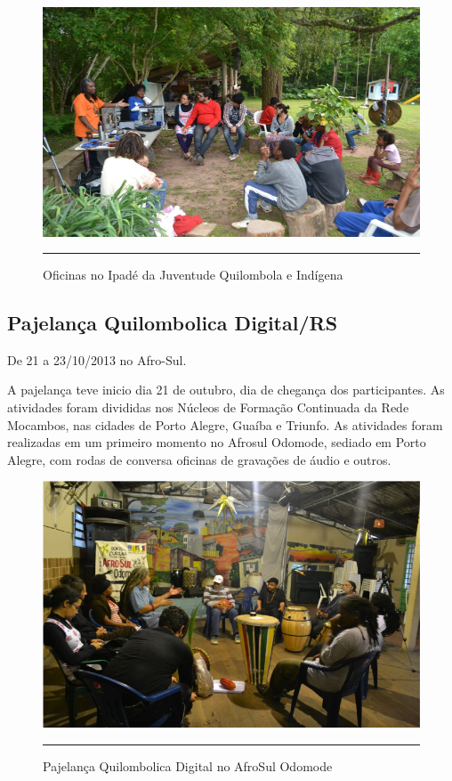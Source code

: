 \documentclass[a4paper, 11pt, oneside]{Relatorio_sem}  %
\begin{document}
\begin{figure}[htbp]
  \centering
  \includegraphics[width=\textwidth]{./Fig/Ipade_RS_1.pdf}
  \rule{35em}{0.5pt}
  \caption[Oficinas no Ipadé da Juventude Quilombola e Indígena]{Oficinas no Ipadé da Juventude Quilombola e Indígena}
  \label{fig:PajelancaPA}
\end{figure}

\subsection{Pajelança Quilombolica Digital/RS}
De 21 a 23/10/2013 no Afro-Sul.

A pajelança teve inicio dia 21 de outubro, dia de chegança dos
participantes.  As atividades foram divididas nos Núcleos de Formação
Continuada da Rede Mocambos, nas cidades de Porto Alegre, Guaíba e
Triunfo. As atividades foram realizadas em um primeiro momento no
Afrosul Odomode, sediado em Porto Alegre, com rodas de conversa
oficinas de gravações de áudio e outros.

\begin{figure}[htbp]
  \centering
  \includegraphics[width=\textwidth]{./Fig/PajelancaAfroSul_1.pdf}
  \rule{35em}{0.5pt}
  \caption[Pajelança Quilombolica Digital no AfroSul Odomode]{Pajelança Quilombolica Digital no AfroSul Odomode}
  \label{fig:PajelancaRS1}
\end{figure}
\end{document}
